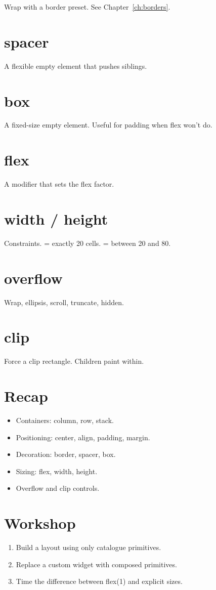 Wrap with a border preset. See Chapter~\ref{ch:borders}.

\section{spacer}

A flexible empty element that pushes siblings.

\section{box}

A fixed-size empty element. Useful for padding when
flex won't do.

\section{flex}

A modifier that sets the flex factor.

\section{width / height}

Constraints.  = exactly 20 cells.
 = between 20 and 80.

\section{overflow}

Wrap, ellipsis, scroll, truncate, hidden.

\section{clip}

Force a clip rectangle. Children paint within.

\section{Recap}

\begin{recap}
\begin{itemize}[leftmargin=*]
  \item Containers: column, row, stack.
  \item Positioning: center, align, padding, margin.
  \item Decoration: border, spacer, box.
  \item Sizing: flex, width, height.
  \item Overflow and clip controls.
\end{itemize}
\end{recap}

\section*{Workshop}

\begin{enumerate}[leftmargin=*]
  \item Build a layout using only catalogue primitives.
  \item Replace a custom widget with composed primitives.
  \item Time the difference between flex(1) and explicit
    sizes.
\end{enumerate}
